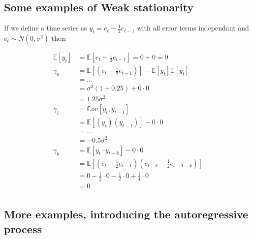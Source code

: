 \subsection{Some examples of Weak stationarity}
If we define a time series as $y_t = e_t - \frac{1}{2}e_{t-1}$ with all error
terms independant and $e_t \sim N(0, \sigma^2)$ then:

\begin{equation*}
    \begin{aligned}
        \mathbb{E}[y_t] &= \mathbb{E}[e_t - \frac{1}{2}e_{t-1}] = 0 + 0 = 0 \\
        \gamma_0 &= \mathbb{E}[\left( e_t - \frac{1}{2}e_{t-1}\right)] - \mathbb{E}[y_t] \mathbb{E}[y_t]  \\
                 &= \dots \\
                 &= \sigma^2(1 + 0.25) + 0 \cdot 0 \\
                 &= 1.25 \sigma^2 \\
        \gamma_1 &= \mathbb{C}ov[y_t, y_{t-1}] \\
                 &= \mathbb{E}[\left( y_t \right) \left( y_{t-1}\right)] -
                 0 \cdot 0\\
                 &= \dots \\
                 &= -0.5\sigma^2 \\
        \gamma_k &= \mathbb{E}[y_t \cdot y_{t-k}]  - 0 \cdot 0\\
                 &= \mathbb{E}[\left( e_t - \frac{1}{2}e_{t-1} \right) \left(
                 e_{t-k} - \frac{1}{2}e_{t-1-k} \right)] \\
                 &= 0 - \frac{1}{2} \cdot 0 - \frac{1}{2} \cdot  0 +
                 \frac{1}{4} \cdot 0 \\
                 &= 0\\
    \end{aligned}
\end{equation*}

\subsection{More examples, introducing the autoregressive process}

